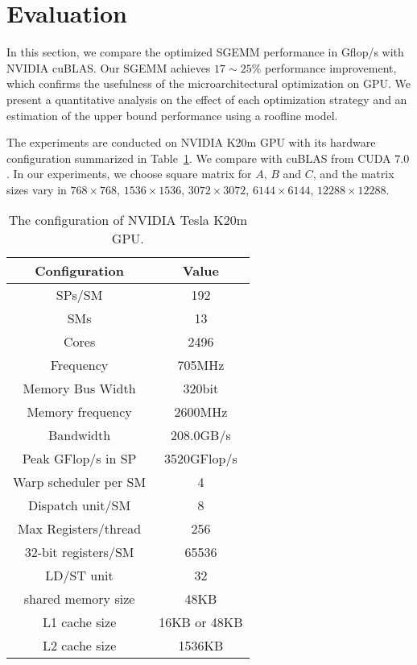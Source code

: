 \section{Evaluation}
\label{sec:experiment}


In this section, we compare the optimized SGEMM performance in Gflop/s with NVIDIA cuBLAS. 
Our SGEMM achieves $17\sim 25\%$ performance
improvement, which confirms the usefulness of the microarchitectural optimization on GPU. 
We present 
a quantitative analysis on the effect of each optimization strategy and an estimation of the upper bound performance using a roofline model.

The experiments are conducted on NVIDIA K20m GPU with its hardware configuration summarized in 
Table~\ref{table:k20}. We compare with cuBLAS from CUDA $7.0$. In our experiments, we choose square matrix for $A$, $B$
and $C$, and  the matrix sizes vary in $768\times768$, $1536\times1536$, $3072\times3072$, $6144\times6144$, $12288\times12288$.

\begin{table}[htbp]
\caption{The configuration of NVIDIA Tesla K20m GPU.}
\centering
\scalebox{0.8} {
\begin{tabular}{|c|c|}
\hline
Configuration& Value\\
\hline
SPs/SM &192\\
\hline
SMs&13\\
\hline
Cores &2496\\
\hline
Frequency&705MHz\\
\hline
Memory Bus Width&320bit \\
\hline
Memory frequency&2600MHz\\
\hline
Bandwidth&208.0GB/s\\
\hline
Peak GFlop/s in SP&3520GFlop/s\\
\hline
Warp scheduler per SM&4\\
\hline
Dispatch unit/SM&8\\
\hline
Max Registers/thread&256 \\
\hline
    32-bit registers/SM&65536 \\ %
\hline
LD/ST unit&32 \\
\hline
shared memory size&48KB\\
\hline
L1 cache size&16KB or 48KB\\
\hline
L2 cache size&1536KB\\
\hline
\end{tabular}
}
\label{table:k20}
\end{table}


